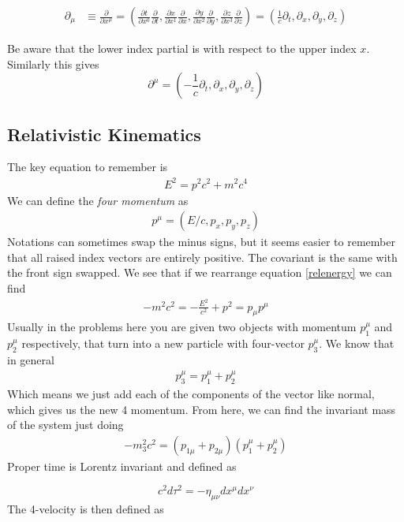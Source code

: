 \begin{align}
\partial_\mu &\equiv \frac{\partial}{\partial x^\mu} = (\frac{\partial t}{\partial x^0}\frac{\partial}{\partial t}, \frac{\partial x}{\partial x^1}\frac{\partial}{\partial x}, \frac{\partial y}{\partial x^2} \frac{\partial}{\partial y},\frac{\partial z}{\partial x^3}\frac{\partial}{\partial z} ) = (\frac{1}{c} \partial_t, \partial_x,\partial_y,\partial_z)
\end{align}

Be aware that the lower index partial is with respect to the upper index $x$. Similarly this gives
$$\partial^\mu = (-\frac{1}{c}\partial_t,\partial_x,\partial_y, \partial_z)$$

\subsection{Relativistic Kinematics}
The key equation to remember is 
\begin{align}\label{relenergy}
    E^2 = p^2c^2 +m^2c^4
\end{align}
We can define the \emph{four momentum} as
\begin{align}
    p^\mu = (E/c,p_x,p_y,p_z)
\end{align}
Notations can sometimes swap the minus signs, but it seems easier to remember that all raised index vectors are entirely positive. The covariant is the same with the front sign swapped. We see that if we rearrange equation \ref{relenergy} we can find
\begin{align}
- m^2c^2 = -\frac{E^2}{c^2} + p^2 = p_\mu p^\mu
\end{align}
Usually in the problems here you are given two objects with momentum $p_1^\mu$ and $p_2^\mu$ respectively, that turn into a new particle with four-vector $p_3^\mu$. We know that in general
\begin{align}
    p_3^\mu = p_1^\mu + p_2^\mu
\end{align}
Which means we just add each of the components of the vector like normal, which gives us the new 4 momentum. From here, we can find the invariant mass of the system just doing
\begin{align}
    -m_3^2c^2 = (p_{1\mu} + p_{2\mu})(p_1^\mu + p_2^\mu)
\end{align}
Proper time is Lorentz invariant and defined as

\begin{equation}\label{propertime}
c^2d\tau^2 = -\eta_{\mu\nu}dx^{\mu}dx^{\nu}
\end{equation}
The 4-velocity is then defined as

